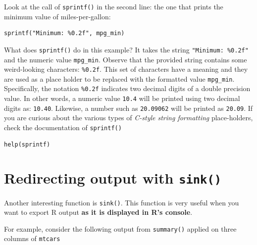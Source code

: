 \documentclass[
]{book}
\begin{document}
Look at the call of \texttt{sprintf()} in the second line: the one that prints the
minimum value of miles-per-gallon:

\begin{verbatim}
sprintf("Minimum: %0.2f", mpg_min)
\end{verbatim}

What does \texttt{sprintf()} do in this example? It takes the string \texttt{"Minimum:\ \%0.2f"}
and the numeric value \texttt{mpg\_min}. Observe that the provided string contains
some weird-looking characters: \texttt{\%0.2f}. This set of characters have a meaning
and they are used as a place holder to be replaced with the formatted value
\texttt{mpg\_min}. Specifically, the notation \texttt{\%0.2f} indicates two decimal digits
of a double precision value. In other words, a numeric value \texttt{10.4} will be
printed using two decimal digits as: \texttt{10.40}. Likewise, a number such as
\texttt{20.09062} will be printed as \texttt{20.09}. If you are curious about the various
types of \emph{C-style string formatting} place-holders, check the documentation
of \texttt{sprintf()}

\begin{verbatim}
help(sprintf)
\end{verbatim}

\hypertarget{redirecting-output-with-sink}{%
\section{\texorpdfstring{Redirecting output with \texttt{sink()}}{Redirecting output with sink()}}\label{redirecting-output-with-sink}}

Another interesting function is \texttt{sink()}. This function is very useful when
you want to export R output \textbf{as it is displayed in R's console}.

For example, consider the following output from \texttt{summary()} applied on three
columns of \texttt{mtcars}
\end{document}
